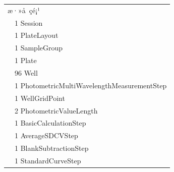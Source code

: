 \documentclass[UTF8,10pt,a4paper,fontset=fandol]{ctexart}
\newcommand{\fieldvalue}[1]{#1}
\begin{document}
\begin{tabular}{ll}
\multicolumn{2}{l}{æ·»å çé¡¹}\\
&
\fieldvalue{1}\quad
\fieldvalue{Session}\\
&
\fieldvalue{1}\quad
\fieldvalue{PlateLayout}\\
&
\fieldvalue{1}\quad
\fieldvalue{SampleGroup}\\
&
\fieldvalue{1}\quad
\fieldvalue{Plate}\\
&
\fieldvalue{96}\quad
\fieldvalue{Well}\\
&
\fieldvalue{1}\quad
\fieldvalue{PhotometricMultiWavelengthMeasurementStep}\\
&
\fieldvalue{1}\quad
\fieldvalue{WellGridPoint}\\
&
\fieldvalue{2}\quad
\fieldvalue{PhotometricValueLength}\\
&
\fieldvalue{1}\quad
\fieldvalue{BasicCalculationStep}\\
&
\fieldvalue{1}\quad
\fieldvalue{AverageSDCVStep}\\
&
\fieldvalue{1}\quad
\fieldvalue{BlankSubtractionStep}\\
&
\fieldvalue{1}\quad
\fieldvalue{StandardCurveStep}\\

\end{tabular}
\end{document}
